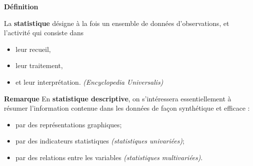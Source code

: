 \documentclass[aspectratio=169,xcolor=dvipsnames]{beamer}
\begin{document}
\begin{frame}

\begin{block}{\textbf{Définition}}

La \textbf{statistique} désigne à la fois un ensemble de données d'observations, et l'activité qui consiste dans
	\begin{itemize}
	\item leur recueil,
	\item leur traitement,
	\item et leur interprétation. \hfill \emph{(Encyclopedia Universalis)}
	\end{itemize}

\end{block}

\begin{exampleblock}{\textbf{Remarque}}
En \textbf{statistique descriptive}, on s'intéressera essentiellement à résumer l'information contenue dans les données de façon synthétique et efficace :
	\begin{itemize}
	\item par des représentations graphiques;
	\item par des indicateurs statistiques \emph{(statistiques univariées)};
	\item par des relations entre les variables \emph{(statistiques multivariées)}.
	\end{itemize}
\end{exampleblock}

\end{frame}
\end{document}
